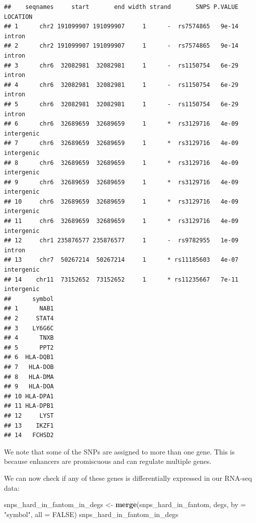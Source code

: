 \documentclass[9pt,a4paper,]{extarticle}
\newenvironment{Shaded}{\begin{snugshade}}{\end{snugshade}}
\newcommand{\KeywordTok}[1]{\textcolor[rgb]{0.13,0.29,0.53}{\textbf{#1}}}
\newcommand{\DataTypeTok}[1]{\textcolor[rgb]{0.13,0.29,0.53}{#1}}
\newcommand{\StringTok}[1]{\textcolor[rgb]{0.31,0.60,0.02}{#1}}
\newcommand{\OtherTok}[1]{\textcolor[rgb]{0.56,0.35,0.01}{#1}}
\newcommand{\NormalTok}[1]{#1}
\begin{document}
\begin{verbatim}
##    seqnames     start       end width strand       SNPS P.VALUE   LOCATION
## 1      chr2 191099907 191099907     1      -  rs7574865   9e-14     intron
## 2      chr2 191099907 191099907     1      -  rs7574865   9e-14     intron
## 3      chr6  32082981  32082981     1      -  rs1150754   6e-29     intron
## 4      chr6  32082981  32082981     1      -  rs1150754   6e-29     intron
## 5      chr6  32082981  32082981     1      -  rs1150754   6e-29     intron
## 6      chr6  32689659  32689659     1      *  rs3129716   4e-09 intergenic
## 7      chr6  32689659  32689659     1      *  rs3129716   4e-09 intergenic
## 8      chr6  32689659  32689659     1      *  rs3129716   4e-09 intergenic
## 9      chr6  32689659  32689659     1      *  rs3129716   4e-09 intergenic
## 10     chr6  32689659  32689659     1      *  rs3129716   4e-09 intergenic
## 11     chr6  32689659  32689659     1      *  rs3129716   4e-09 intergenic
## 12     chr1 235876577 235876577     1      -  rs9782955   1e-09     intron
## 13     chr7  50267214  50267214     1      * rs11185603   4e-07 intergenic
## 14    chr11  73152652  73152652     1      * rs11235667   7e-11 intergenic
##      symbol
## 1      NAB1
## 2     STAT4
## 3    LY6G6C
## 4      TNXB
## 5      PPT2
## 6  HLA-DQB1
## 7   HLA-DOB
## 8   HLA-DMA
## 9   HLA-DOA
## 10 HLA-DPA1
## 11 HLA-DPB1
## 12     LYST
## 13    IKZF1
## 14   FCHSD2
\end{verbatim}

We note that some of the SNPs are assigned to more than one gene.
This is because enhancers are promiscuous and can regulate multiple genes.

We can now check if any of these genes is differentially expressed in our RNA-seq data:

\begin{Shaded}
\begin{Highlighting}[]
\NormalTok{snps_hard_in_fantom_in_degs <-}\StringTok{ }\KeywordTok{merge}\NormalTok{(snps_hard_in_fantom, degs, }\DataTypeTok{by =} \StringTok{"symbol"}\NormalTok{, }\DataTypeTok{all =} \OtherTok{FALSE}\NormalTok{)}
\NormalTok{snps_hard_in_fantom_in_degs}
\end{Highlighting}
\end{Shaded}
\end{document}
